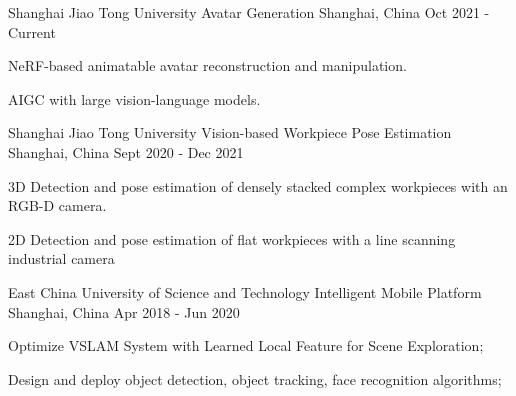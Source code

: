 

\begin{cventries}

  \cventry
    {Shanghai Jiao Tong University} %
    {Avatar Generation} %
    {Shanghai, China} %
    {Oct 2021 - Current} %
    {
      \begin{cvitems} %
        \item {NeRF-based animatable avatar reconstruction and manipulation.}
        \item {AIGC with large vision-language models.}
      \end{cvitems}
    }

  \cventry
    {Shanghai Jiao Tong University} %
    {Vision-based Workpiece Pose Estimation} %
    {Shanghai, China} %
    {Sept 2020 - Dec 2021} %
    {
      \begin{cvitems} %
        \item {3D Detection and pose estimation of densely stacked complex workpieces with an RGB-D camera.}
        \item {2D Detection and pose estimation of flat workpieces with a line scanning industrial camera}
      \end{cvitems}
    }

  \cventry
    {East China University of Science and Technology} %
    {Intelligent Mobile Platform} %
    {Shanghai, China} %
    {Apr 2018 - Jun 2020} %
    {
      \begin{cvitems} %
        \item {Optimize VSLAM System with Learned Local Feature for Scene Exploration;}
        \item {Design and deploy object detection, object tracking, face recognition algorithms;}
      \end{cvitems}
    }


\end{cventries}

